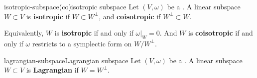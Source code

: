 \begin{topic}{isotropic-subspace}{(co)isotropic subspace}
    Let $(V, \omega)$ be a . A linear subspace $W \subset V$ is \textbf{isotropic} if $W \subset W^\perp$, and \textbf{coisotropic} if $W^\perp \subset W$.
    
    Equivalently, $W$ is \textbf{isotropic} if and only if $\omega|_W = 0$. And $W$ is \textbf{coisotropic} if and only if $\omega$ restricts to a symplectic form on $W/W^\perp$.
\end{topic}

\begin{topic}{lagrangian-subspace}{Lagrangian subspace}
    Let $(V, \omega)$ be a . A linear subspace $W \subset V$ is \textbf{Lagrangian} if $W = W^\perp$.
\end{topic}

